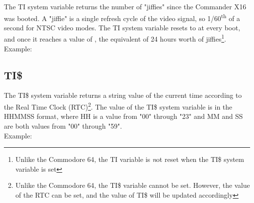 The {\ttfamily TI} system variable returns the number of "jiffies" since the
Commander X16 was booted.  A "jiffie" is a single refresh cycle of the video
signal, so 1/60\textsuperscript{th} of a second for NTSC video modes.  The
{\ttfamily TI} system variable resets to {} at every boot, and once
it reaches a value of {}, the equivalent of 24 hours worth of
jiffies\footnote{Unlike the Commodore 64, the {\ttfamily TI} variable is {\emph
not} reset when the {\ttfamily TI\$} system variable is set}.\\

Example:\\


\subsection{TI\$}

The {\ttfamily TI\$} system variable returns a string value of the current time
according to the Real Time Clock (RTC)\footnote{Unlike the Commodore 64, the
{\ttfamily TI\$} variable cannot be set.  However, the value of the RTC can be
set, and the value of {\ttfamily TI\$} will be updated accordingly}.  The value
of the {\ttfamily TI\$} system variable is in the HHMMSS format, where HH is a
value from "00" through "23" and MM and SS are both values from "00" through
"59".\\

Example:\\

